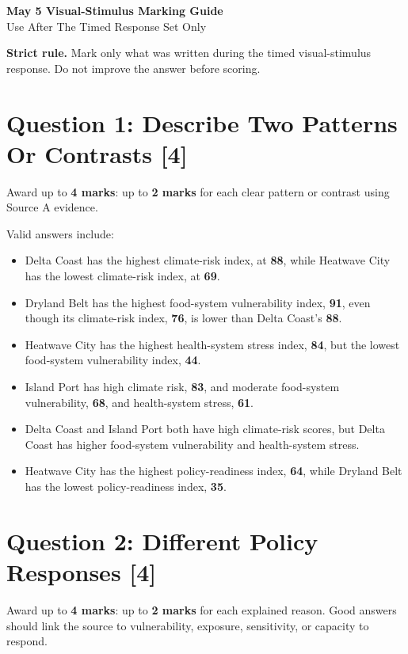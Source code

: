 \documentclass[11pt,a4paper]{article}
\newcommand{\term}[1]{\textcolor{HeadingBlue}{\textbf{#1}}}
\newcommand{\score}[1]{\textcolor{AccentTeal}{\textbf{#1}}}
\newcommand{\boxnote}[3]{%
\noindent\colorbox{#1}{%
  \begin{minipage}{0.965\textwidth}
  \sffamily
  \textbf{\textcolor{HeadingBlue}{#2}} #3
  \end{minipage}
}}
\begin{document}
\begin{center}
  {\sffamily\bfseries\color{HeadingBlue}\LARGE May 5 Visual-Stimulus Marking Guide}\\[0.25em]
  {\sffamily\color{AccentTeal}\large Use After The Timed Response Set Only}
\end{center}

\boxnote{SoftRed}{Strict rule.}{Mark only what was written during the timed
visual-stimulus response. Do not improve the answer before scoring.}

\section{Question 1: Describe Two Patterns Or Contrasts [4]}

Award up to \score{4 marks}: up to \score{2 marks} for each clear pattern or
contrast using Source A evidence.

Valid answers include:

\begin{itemize}
  \item Delta Coast has the highest climate-risk index, at \term{88}, while
  Heatwave City has the lowest climate-risk index, at \term{69}.
  \item Dryland Belt has the highest food-system vulnerability index,
  \term{91}, even though its climate-risk index, \term{76}, is lower than
  Delta Coast's \term{88}.
  \item Heatwave City has the highest health-system stress index,
  \term{84}, but the lowest food-system vulnerability index, \term{44}.
  \item Island Port has high climate risk, \term{83}, and moderate food-system
  vulnerability, \term{68}, and health-system stress, \term{61}.
  \item Delta Coast and Island Port both have high climate-risk scores, but
  Delta Coast has higher food-system vulnerability and health-system stress.
  \item Heatwave City has the highest policy-readiness index, \term{64}, while
  Dryland Belt has the lowest policy-readiness index, \term{35}.
\end{itemize}

\section{Question 2: Different Policy Responses [4]}

Award up to \score{4 marks}: up to \score{2 marks} for each explained reason.
Good answers should link the source to vulnerability, exposure, sensitivity, or
capacity to respond.
\end{document}
